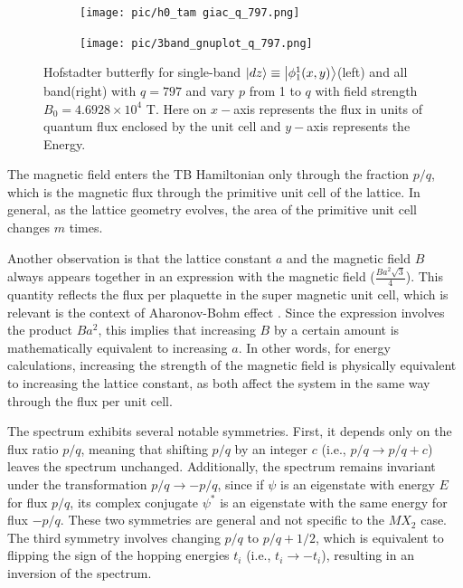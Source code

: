 \documentclass{report}
\begin{document}
\begin{figure}[htb]
	\centering
	\begin{subfigure}[b]{0.495\textwidth}
		\centering
		\texttt{[image: pic/h0\_tam giac\_q\_797.png]}
		\label{fig:3 band}
	\end{subfigure}
	\begin{subfigure}[b]{0.495\textwidth}
		\centering
		\texttt{[image: pic/3band\_gnuplot\_q\_797.png]}
		\label{fig:1 band}
	\end{subfigure}
	\caption[Hofstadter butterfly for \ac{TMD}.]{
		Hofstadter butterfly for single-band $\ket{dz} \equiv \ket{\phi_{1}^{1}(x,y)}$(left) and all band(right) with $q = 797$ and vary $p$ from 1 to $q$ with field strength $B_{0} = 4.6928 \times 10^{4}$ T. Here on $x-$axis represents the flux in units of quantum flux enclosed by the unit cell and $y-$axis represents the Energy.
	}
\end{figure}

The magnetic field enters the \ac{TB} Hamiltonian only through the fraction $p/q$, which is the magnetic flux through the primitive unit cell of the lattice. In general, as the lattice geometry evolves, the area of the primitive unit cell changes $m$ times. 

Another observation is that the lattice constant $a$ and the magnetic field $B$ always appears together in an expression with the magnetic field ($\tfrac{Ba^{2}\sqrt{3}}{4}$). This quantity reflects the flux per plaquette in the super magnetic unit cell, which is relevant is the context of Aharonov-Bohm effect \cite{aharonov1959}. Since the expression involves the product $Ba^{2}$, this implies that increasing $B$ by a certain amount is mathematically equivalent to increasing $a$. In other words, for energy calculations, increasing the strength of the magnetic field is physically equivalent to increasing the lattice constant, as both affect the system in the same way through the flux per unit cell.

The spectrum exhibits several notable symmetries. First, it depends only on the flux ratio $p/q$, meaning that shifting $p/q$ by an integer $c$ (i.e., $p/q \rightarrow p/q + c$) leaves the spectrum unchanged. Additionally, the spectrum remains invariant under the transformation $p/q \rightarrow -p/q$, since if $\psi$ is an eigenstate with energy $E$ for flux $p/q$, its complex conjugate $\psi^*$ is an eigenstate with the same energy for flux $-p/q$. These two symmetries are general and not specific to the $MX_{2}$ case. The third symmetry involves changing $p/q$ to $p/q + 1/2$, which is equivalent to flipping the sign of the hopping energies $t_{i}$ (i.e., $t_{i} \rightarrow -t_{i}$), resulting in an inversion of the spectrum.
\end{document}
